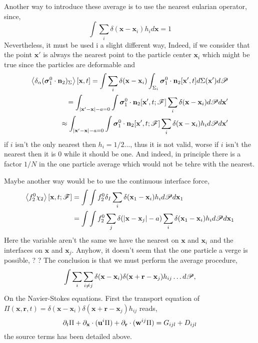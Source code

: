 \documentclass[12pt]{My_preprint}
\begin{document}
Another way to introduce these average is to use the nearest eularian operator, since, 
\begin{equation*}
    \int \sum_i \delta(\textbf{x}-\textbf{x}_i)h_i d\textbf{x} = 1
\end{equation*}
Nevertheless, it must be used i a slight different way, 
Indeed, if we consider that the point $\textbf{x}'$ is always the nearest point to the particle center $\textbf{x}_i$ which might be true since the particles are deformable and 
\begin{align*}
    \left<\delta_\alpha ( \bm\sigma_1^0 \cdot \textbf{n}_2  )_{\Sigma}\right>[\textbf{x},t]
    = \int\sum_i \delta(\textbf{x}-\textbf{x}_i)\int_{\Sigma_i} \bm\sigma_1^0 \cdot \textbf{n}_2 [\textbf{x}',t]d\Sigma(\textbf{x}')  d\mathscr{P}\\
    = 
    \int_{|\textbf{x}' - \textbf{x}| - a = 0}
    \int
    \bm\sigma_1^0 \cdot \textbf{n}_2 [\textbf{x}',t;\mathscr{F}]
    \sum_i  
    \delta(\textbf{x}-\textbf{x}_i)
    d\mathscr{P}
    d\textbf{x}'\\
    \approx 
    \int_{|\textbf{x}' - \textbf{x}| - a = 0}
    \int
    \bm\sigma_1^0 \cdot \textbf{n}_2 [\textbf{x}',t;\mathscr{F}]
    \sum_i  
    \delta(\textbf{x}-\textbf{x}_i) h_i
    d\mathscr{P}
    d\textbf{x}'
\end{align*}
if $i$ isn't the only nearest then $h_i =1/2...$, thus it is not valid, worse if $i$ isn't the nearest then it is $0$ while it should be one. 
And indeed, in principle there is a factor $1/N$ in the one particle average which would not be tehre with the nearest. 

Maybe another way would be to use the continuous interface force, 
\begin{align}
    \left<f_2^0 \chi_2\right>[\textbf{x},t;\mathscr{F}]
    &= \int \int f_2^0 \delta_I  \sum_i \delta(\textbf{x}_1-\textbf{x}_i)h_i d\mathscr{P} d\textbf{x}_1\\
    &= \int \int f_2^0 \sum_j \delta(|\textbf{x}-\textbf{x}_j| - a)  \sum_i \delta(\textbf{x}_1-\textbf{x}_i)h_i d\mathscr{P} d\textbf{x}_1\\
\end{align} 
Here the variable aren't the same we have the nearest on $\textbf{x}$ and $\textbf{x}_i$ and the interfaces on $\textbf{x}$ and $\textbf{x}_j$. 
Anyhow, it doesn't seem that the one particle a
verge is possible, ? ?
The conclusion is that we must perform the average procedure, 
\begin{equation*}
    \int
    \sum_i \sum_{i\neq j} 
    \delta(\textbf{x}-\textbf{x}_i)
    \delta(\textbf{x}+ \textbf{r}-\textbf{x}_j)
    h_{ij}
    \ldots 
    d\mathscr{P},
\end{equation*}
On the Navier-Stokes equations. 
First the transport equation of $\Pi(\textbf{x},\textbf{r},t) = \delta(\textbf{x}-\textbf{x}_i)\delta(\textbf{x}+ \textbf{r}-\textbf{x}_j)h_{ij}$ reads, 
\begin{equation}
    \partial_t \Pi
    + \partial_{\textbf{x}} \cdot (\textbf{u}^i \Pi)
    + \partial_{\textbf{r}}  \cdot (\textbf{w}^{ij} \Pi)
    = G_{ijl}+D_{ijl}
\end{equation}
the source terms has been detailed above. 
\end{document}
